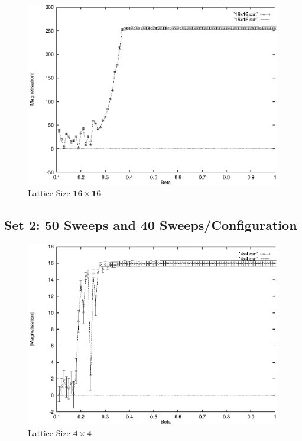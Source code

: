 \documentclass[a4paper]{IEEEtran}
\begin{document}
    \begin{figure} 
    \caption{Lattice Size $\mathbf{16 \times 16}$}
    \label{fig:16x16-1} 
    \begin{center}
        \includegraphics[width=\columnwidth]{16x16_1.eps}
    \end{center}
    \end{figure} 


    \subsection{Set 2:  50 Sweeps and 40 Sweeps/Configuration}
  
    \begin{figure}
    \caption{Lattice Size $\mathbf{4 \times 4}$}
    \label{fig:4x4-2} 
    \begin{center}
        \includegraphics[width=\columnwidth]{4x4_2.eps}
    \end{center}
    \end{figure} 
\end{document}
